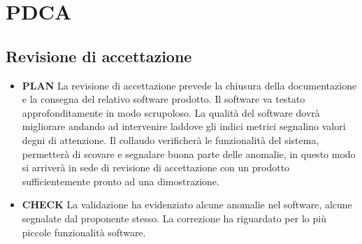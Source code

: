 \section{PDCA}
\subsection{Revisione di accettazione}
\begin{itemize}
\item \textbf{PLAN} La revisione di accettazione prevede la chiusura della documentazione e la consegna
del relativo software prodotto. Il software va testato approfonditamente in modo scrupoloso.
La qualità del software dovrà migliorare andando ad intervenire laddove gli indici metrici
segnalino valori degni di attenzione. Il collaudo verificherà le funzionalità del sistema,
permetterà di scovare e segnalare buona parte delle anomalie, in questo modo si arriverà
in sede di revisione di accettazione con un prodotto sufficientemente pronto ad una
dimostrazione.
\item \textbf{CHECK} La validazione ha evidenziato alcune anomalie nel software, alcune segnalate dal
proponente stesso. La correzione ha riguardato per lo più piccole funzionalità software.
\end{itemize}